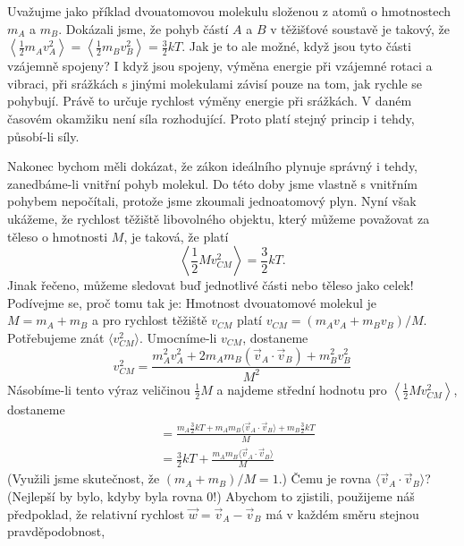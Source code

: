     Uvažujme jako příklad dvouatomovou molekulu složenou z atomů o hmotnostech \(m_A\) a \(m_B\).
    Dokázali jsme, že pohyb částí \(A\) a \(B\) v těžišťové soustavě je takový, že
    \(\left\langle\frac{1}{2}m_Av^2_A\right\rangle=\left\langle\frac{1}{2}m_Bv^2_B\right\rangle =
    \frac{3}{2}kT\). Jak je to ale možné, když jsou tyto části vzájemně spojeny? I když jsou
    spojeny, výměna energie při vzájemné rotaci a vibraci, při srážkách s jinými molekulami závisí
    pouze na tom, jak rychle se pohybují. Právě to určuje rychlost výměny energie při srážkách. V
    daném časovém okamžiku není síla rozhodující. Proto platí stejný princip i tehdy, působí-li
    síly.

    Nakonec bychom měli dokázat, že zákon ideálního plynuje správný i tehdy, zanedbáme-li vnitřní
    pohyb molekul. Do této doby jsme vlastně s vnitřním pohybem nepočítali, protože jsme zkoumali
    jednoatomový plyn. Nyní však ukážeme, že rychlost těžiště libovolného objektu, který můžeme
    považovat za těleso o hmotnosti \(M\), je taková, že platí
    \begin{equation}\label{fyz:eq634}
      \left\langle\frac{1}{2}Mv^2_{CM}\right\rangle = \frac{3}{2}kT.
    \end{equation}
    Jinak řečeno, můžeme sledovat buď jednotlivé části nebo těleso jako celek! Podívejme se, proč
    tomu tak je: Hmotnost dvouatomové molekul je \(M = m_A + m_B\) a pro rychlost těžiště \(v_{CM}\)
    platí \(v_{CM} = (m_Av_A + m_Bv_B)/M\). Potřebujeme znát \(⟨v^2_{CM}⟩\). Umocníme-li \(v_{CM}\),
    dostaneme
    \begin{equation}\label{fyz:eq635}
      v^2_{CM} = \frac{m^2_Av^2_A+2m_Am_B(\vec{v}_A\cdot\vec{v}_B)+m^2_Bv^2_B}{M^2}
    \end{equation}
    Násobíme-li tento výraz veličinou \(\frac{1}{2}M\) a najdeme střední hodnotu pro
    \(\left\langle\frac{1}{2}Mv^2_{CM}\right\rangle\), dostaneme
    \begin{align}
      &= \frac{m_A\frac{3}{2}kT + m_Am_B⟨\vec{v}_A\cdot\vec{v}_B⟩ + m_B\frac{3}{2}kT}{M}\nonumber\\
      &= \frac{3}{2}kT + \frac{m_Am_B⟨\vec{v}_A\cdot\vec{v}_B⟩}{M}                \label{fyz:eq636}
    \end{align}
    (Využili jsme skutečnost, že \((m_A + m_B)/M=1\).) Čemu je rovna  \(⟨\vec{v}_A\cdot\vec{v}_B⟩\)?
    (Nejlepší by bylo, kdyby byla rovna 0!) Abychom to zjistili, použijeme náš předpoklad, že
    relativní rychlost \(\vec{w} = \vec{v}_A-\vec{v}_B\) má v každém směru stejnou pravděpodobnost,
